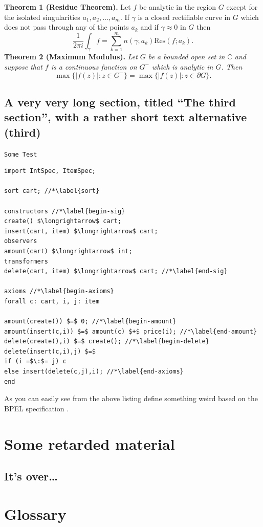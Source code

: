 \documentclass[]{usiinfthesis}
\begin{document}
\textbf{Theorem 1 (Residue Theorem).}
Let $f$ be analytic in the region $G$ except for the isolated singularities $a_1,a_2,\ldots,a_m$. If $\gamma$ is a closed rectifiable curve in $G$ which does not pass through any of the points $a_k$ and if $\gamma\approx 0$ in $G$ then
\[
\frac{1}{2\pi i}\int_\gamma f = \sum_{k=1}^m n(\gamma;a_k) \text{Res}(f;a_k).
\]
\textbf{Theorem 2 (Maximum Modulus).}
\emph{Let $G$ be a bounded open set in $\mathbb{C}$ and suppose that $f$ is a continuous function on $G^-$ which is analytic in $G$. Then}
\[
\max\{|f(z)|:z\in G^-\}=\max \{|f(z)|:z\in \partial G \}.
\]

\section[third]{A very very long section, titled ``The third section'', with
  a rather  short text alternative (third)}
\lipsum \texttt{Some Test}
\begin{lstlisting}
import IntSpec, ItemSpec;

sort cart; //*\label{sort}

constructors //*\label{begin-sig}
create() $\longrightarrow$ cart;
insert(cart, item) $\longrightarrow$ cart;
observers
amount(cart) $\longrightarrow$ int;
transformers
delete(cart, item) $\longrightarrow$ cart; //*\label{end-sig}

axioms //*\label{begin-axioms}
forall c: cart, i, j: item 

amount(create()) $=$ 0; //*\label{begin-amount}
amount(insert(c,i)) $=$ amount(c) $+$ price(i); //*\label{end-amount}
delete(create(),i) $=$ create(); //*\label{begin-delete}
delete(insert(c,i),j) $=$
if (i =$\:$= j) c
else insert(delete(c,j),i); //*\label{end-axioms}
end
\end{lstlisting}

As you can easily see from the above listing \citet{bbggs:iet07}
define something weird based on the BPEL specification
\citep{bpelspec}.
\nocite{*}

\appendix %

\chapter{Some retarded material}
\section{It's over\dots}
\lipsum 

\backmatter

\chapter{Glossary} %

%

%


\cleardoublepage
\theindex %
\lipsum
\end{document}
